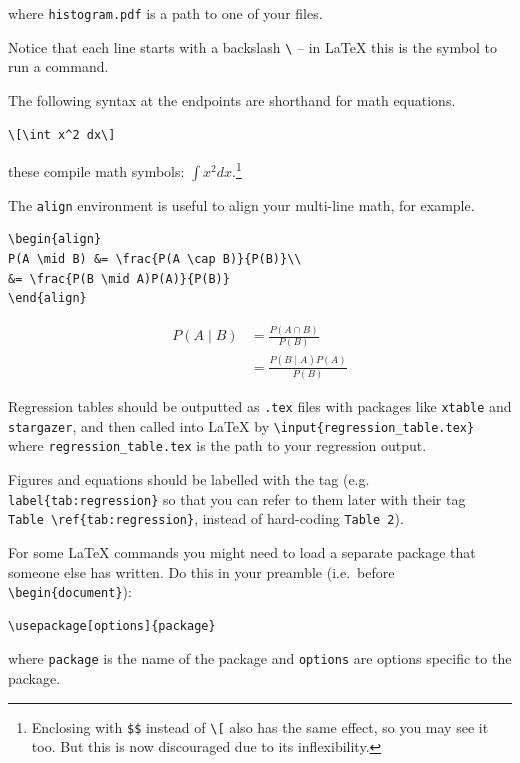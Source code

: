 \documentclass[]{book}
\newenvironment{Shaded}{\begin{snugshade}}{\end{snugshade}}
\let\rmarkdownfootnote\footnote%
\def\footnote{\protect\rmarkdownfootnote}
\theoremstyle{definition}
\theoremstyle{definition}
\theoremstyle{definition}
\theoremstyle{remark}
\begin{document}
\begin{Shaded}
\begin{Highlighting}[]
\begin{Shaded}
\begin{Highlighting}[]
\begin{Shaded}
\begin{Highlighting}[]
where \texttt{histogram.pdf} is a path to one of your files.

Notice that each line starts with a backslash \texttt{\textbackslash{}} -- in LaTeX this is the symbol to run a command.

The following syntax at the endpoints are shorthand for math equations.

\begin{verbatim}
\[\int x^2 dx\]
\end{verbatim}

these compile math symbols: \(\displaystyle \int x^2 dx.\)\footnote{Enclosing with \texttt{\$\$} instead of \texttt{\textbackslash{}{[}} also has the same effect, so you may see it too. But this is now discouraged due to its inflexibility.}

The \texttt{align} environment is useful to align your multi-line math, for example.

\begin{verbatim}
\begin{align}
P(A \mid B) &= \frac{P(A \cap B)}{P(B)}\\
&= \frac{P(B \mid A)P(A)}{P(B)}
\end{align}
\end{verbatim}

\begin{align}
P(A \mid B) &= \frac{P(A \cap B)}{P(B)}\\
&= \frac{P(B \mid A)P(A)}{P(B)}
\end{align}

Regression tables should be outputted as \texttt{.tex} files with packages like \texttt{xtable} and \texttt{stargazer}, and then called into LaTeX by \texttt{\textbackslash{}input\{regression\_table.tex\}} where \texttt{regression\_table.tex} is the path to your regression output.

Figures and equations should be labelled with the tag (e.g. \texttt{label\{tab:regression\}} so that you can refer to them later with their tag \texttt{Table\ \textbackslash{}ref\{tab:regression\}}, instead of hard-coding \texttt{Table\ 2}).

For some LaTeX commands you might need to load a separate package that someone else has written. Do this in your preamble (i.e.~before \texttt{\textbackslash{}begin\{document\}}):

\begin{verbatim}
\usepackage[options]{package}
\end{verbatim}

where \texttt{package} is the name of the package and \texttt{options} are options specific to the package.


\end{Highlighting}
\end{Shaded}
\end{Highlighting}
\end{Shaded}
\end{Highlighting}
\end{Shaded}
\end{document}
